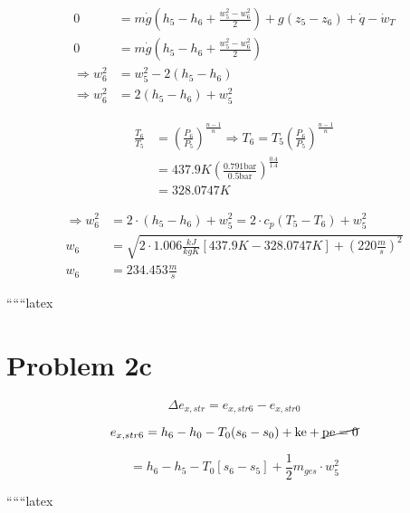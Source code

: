 \begin{align*}
    0 &= m\dot{g} \left( h_5 - h_6 + \frac{w_5^2 - w_6^2}{2} \right) + g \left( z_5 - z_6 \right) + \dot{q} - \dot{w}_T \\
    0 &= m\dot{g} \left( h_5 - h_6 + \frac{w_5^2 - w_6^2}{2} \right) \\
    \Rightarrow w_6^2 &= w_5^2 - 2(h_5 - h_6) \\
    \Rightarrow w_6^2 &= 2(h_5 - h_6) + w_5^2
\end{align*}

\begin{align*}
    \frac{T_6}{T_5} &= \left( \frac{P_6}{P_5} \right)^{\frac{n-1}{n}} \Rightarrow T_6 = T_5 \left( \frac{P_6}{P_5} \right)^{\frac{n-1}{n}} \\
    &= 437.9K \left( \frac{0.791 \text{bar}}{0.5 \text{bar}} \right)^{\frac{0.4}{1.4}} \\
    &= 328.0747K
\end{align*}

\begin{align*}
    \Rightarrow w_6^2 &= 2 \cdot (h_5 - h_6) + w_5^2 = 2 \cdot c_p (T_5 - T_6) + w_5^2 \\
    w_6 &= \sqrt{2 \cdot 1.006 \frac{kJ}{kgK} \left[ 437.9K - 328.0747K \right] + \left( 220 \frac{m}{s} \right)^2} \\
    w_6 &= 234.453 \frac{m}{s}
\end{align*}

``````latex


\section*{Problem 2c}

\[
\Delta e_{x,str} = e_{x,str6} - e_{x,str0}
\]

\[
e_{x,str6} = h_6 - h_0 - T_0 (s_6 - s_0) + \text{ke} + \cancel{\text{pe}=0}
\]

\[
= h_6 - h_5 - T_0 [s_6 - s_5] + \frac{1}{2} m_{ges} \cdot w_5^2
\]

``````latex


